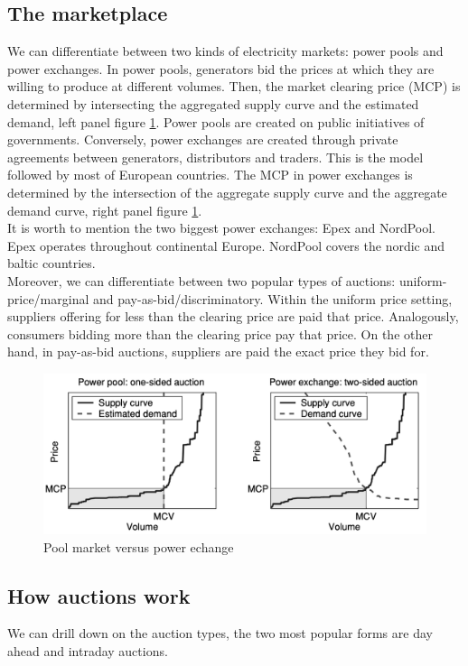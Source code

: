 \subsection{The marketplace}
We can differentiate between two kinds of electricity markets: power pools and power exchanges. In power pools, generators bid the prices at which they are willing to produce at different volumes. Then, the market clearing price (MCP) is determined by intersecting the aggregated supply curve and the estimated demand, left panel figure \ref{fig:pool_vs_echange}. Power pools are created on public initiatives of governments. Conversely, power exchanges are created through private agreements between generators, distributors and traders. This is the model followed by most of European countries.
The MCP in power exchanges is determined by the intersection of the aggregate supply curve and the aggregate demand curve, right panel figure \ref{fig:pool_vs_echange}.
\\
It is worth to mention the two biggest power exchanges: Epex and NordPool. Epex operates throughout continental Europe. NordPool covers the nordic and baltic countries.
\\
Moreover, we can differentiate between two popular types of auctions: uniform-price/marginal and pay-as-bid/discriminatory. Within the uniform price setting, suppliers offering for less than the clearing price are paid that price. Analogously, consumers bidding more than the clearing price pay that price. On the other hand, in pay-as-bid auctions, suppliers are paid the exact price they bid for.


\begin{figure}[!h]
    \includegraphics[width=\textwidth]{images/pool_vs_echange.png}
    \caption{Pool market versus power echange \cite{weron2006modeling}}
    \label{fig:pool_vs_echange}
\end{figure}

\subsection{How auctions work}
We can drill down on the auction types, the two most popular forms are day ahead and intraday auctions.

